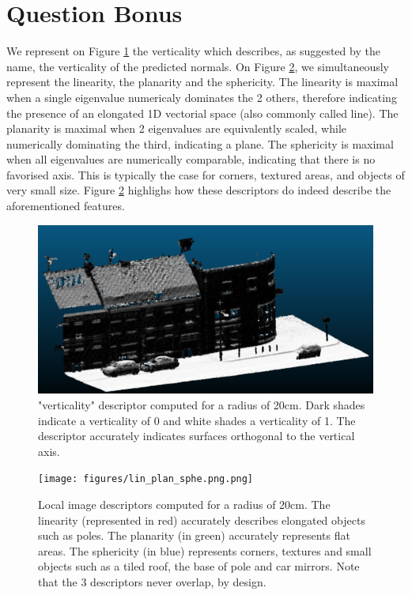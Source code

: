 \documentclass[a4paper]{article}
\begin{document}
\section*{Question Bonus}
We represent on Figure \ref{fig:verticality} the verticality which describes, as suggested by the name, the verticality of the predicted normals.
On Figure \ref{fig:descriptors}, we simultaneously represent the linearity, the planarity and the sphericity. The linearity is maximal when a single
eigenvalue numericaly dominates the 2 others, therefore indicating the presence of an elongated 1D vectorial space (also commonly called line).
The planarity is maximal when 2 eigenvalues are equivalently scaled, while numerically dominating the third, indicating a plane. The sphericity is maximal when 
all eigenvalues are numerically comparable, indicating that there is no favorised axis. This is typically the case for corners, textured areas, and objects of very small size.
Figure \ref{fig:descriptors} highlighs how these descriptors do indeed describe the aforementioned features.



\begin{figure}[ht]
  \centering
  \includegraphics[width=0.46\linewidth]{figures/verticality.png}
  \caption{"verticality" descriptor computed for a radius of 20cm. Dark shades indicate a verticality of 0 and white shades a verticality of 1.
  The descriptor accurately indicates surfaces orthogonal to the vertical axis.} 
  \label{fig:verticality}
\end{figure}

\begin{figure}[ht]
  \centering
  \texttt{[image: figures/lin\_plan\_sphe.png.png]}
  \caption{Local image descriptors computed for a radius of 20cm. The linearity (represented in red) accurately describes elongated objects such as poles.
  The planarity (in green) accurately represents flat areas. The sphericity (in blue) represents corners, textures and small objects such as a tiled roof, the base of pole and car mirrors.
  Note that the 3 descriptors never overlap, by design.} 
  \label{fig:descriptors}
\end{figure}
\end{document}
